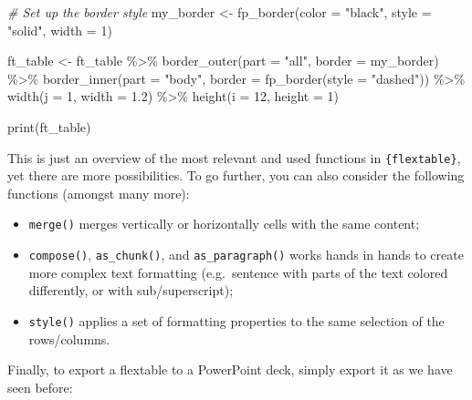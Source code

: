 \documentclass[
]{book}
\newenvironment{Shaded}{\begin{snugshade}}{\end{snugshade}}
\newcommand{\AttributeTok}[1]{\textcolor[rgb]{0.77,0.63,0.00}{#1}}
\newcommand{\CommentTok}[1]{\textcolor[rgb]{0.56,0.35,0.01}{\textit{#1}}}
\newcommand{\DecValTok}[1]{\textcolor[rgb]{0.00,0.00,0.81}{#1}}
\newcommand{\FloatTok}[1]{\textcolor[rgb]{0.00,0.00,0.81}{#1}}
\newcommand{\FunctionTok}[1]{\textcolor[rgb]{0.00,0.00,0.00}{#1}}
\newcommand{\NormalTok}[1]{#1}
\newcommand{\OtherTok}[1]{\textcolor[rgb]{0.56,0.35,0.01}{#1}}
\newcommand{\SpecialCharTok}[1]{\textcolor[rgb]{0.00,0.00,0.00}{#1}}
\newcommand{\StringTok}[1]{\textcolor[rgb]{0.31,0.60,0.02}{#1}}
\providecommand{\tightlist}{%
  \setlength{\itemsep}{0pt}\setlength{\parskip}{0pt}}
\begin{document}
\begin{Shaded}
\begin{Highlighting}[]
\CommentTok{\# Set up the border style}
\NormalTok{my\_border }\OtherTok{\textless{}{-}} \FunctionTok{fp\_border}\NormalTok{(}\AttributeTok{color =} \StringTok{"black"}\NormalTok{, }\AttributeTok{style =} \StringTok{"solid"}\NormalTok{, }\AttributeTok{width =} \DecValTok{1}\NormalTok{)}

\NormalTok{ft\_table }\OtherTok{\textless{}{-}}\NormalTok{ ft\_table }\SpecialCharTok{\%\textgreater{}\%}
  \FunctionTok{border\_outer}\NormalTok{(}\AttributeTok{part =} \StringTok{"all"}\NormalTok{, }\AttributeTok{border =}\NormalTok{ my\_border) }\SpecialCharTok{\%\textgreater{}\%}
  \FunctionTok{border\_inner}\NormalTok{(}\AttributeTok{part =} \StringTok{"body"}\NormalTok{, }\AttributeTok{border =} \FunctionTok{fp\_border}\NormalTok{(}\AttributeTok{style =} \StringTok{"dashed"}\NormalTok{)) }\SpecialCharTok{\%\textgreater{}\%} 
  \FunctionTok{width}\NormalTok{(}\AttributeTok{j =} \DecValTok{1}\NormalTok{, }\AttributeTok{width =} \FloatTok{1.2}\NormalTok{) }\SpecialCharTok{\%\textgreater{}\%}
  \FunctionTok{height}\NormalTok{(}\AttributeTok{i =} \DecValTok{12}\NormalTok{, }\AttributeTok{height =} \DecValTok{1}\NormalTok{)}

\FunctionTok{print}\NormalTok{(ft\_table)}
\end{Highlighting}
\end{Shaded}

This is just an overview of the most relevant and used functions in \texttt{\{flextable\}}, yet there are more possibilities.
To go further, you can also consider the following functions (amongst many more):

\begin{itemize}
\tightlist
\item
  \texttt{merge()} merges vertically or horizontally cells with the same content;
\item
  \texttt{compose()}, \texttt{as\_chunk()}, and \texttt{as\_paragraph()} works hands in hands to create more complex text formatting (e.g.~sentence with parts of the text colored differently, or with sub/superscript);
\item
  \texttt{style()} applies a set of formatting properties to the same selection of the rows/columns.
\end{itemize}

Finally, to export a flextable to a PowerPoint deck, simply export it as we have seen before:
\end{document}
